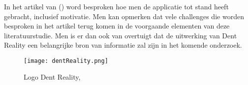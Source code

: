 In het artikel van \textcite{Hart2019} () word besproken hoe men de applicatie tot stand heeft gebracht, inclusief motivatie. Men kan opmerken dat vele challenges die worden besproken in het artikel terug komen in de voorgaande elementen van deze literatuurstudie. Men is er dan ook van overtuigt dat de uitwerking van Dent Reality een belangrijke bron van informatie zal zijn in het komende onderzoek.

\begin{figure}[H]
	\centering
	\texttt{[image: dentReality.png]}
	\caption{Logo Dent Reality, \autocite{Hart2019}}
\end{figure}

